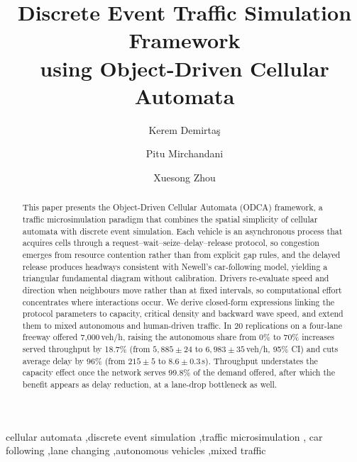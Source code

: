 \documentclass[review,authoryear]{elsarticle}
\begin{document}
\begin{frontmatter}

\title{Discrete Event Traffic Simulation Framework\\using Object-Driven Cellular Automata}

\author[asu]{Kerem Demirta\c{s}}
\author[asu]{Pitu Mirchandani}
\author[ssebe]{Xuesong Zhou}


\begin{abstract}
This paper presents the Object-Driven Cellular Automata (ODCA) framework, a traffic microsimulation paradigm that combines the spatial simplicity of cellular automata with discrete event simulation. Each vehicle is an asynchronous process that acquires cells through a request--wait--seize--delay--release protocol, so congestion emerges from resource contention rather than from explicit gap rules, and the delayed release produces headways consistent with Newell's car-following model, yielding a triangular fundamental diagram without calibration. Drivers re-evaluate speed and direction when neighbours move rather than at fixed intervals, so computational effort concentrates where interactions occur. We derive closed-form expressions linking the protocol parameters to capacity, critical density and backward wave speed, and extend them to mixed autonomous and human-driven traffic. In 20 replications on a four-lane freeway offered 7{,}000\,veh/h, raising the autonomous share from 0\% to 70\% increases served throughput by 18.7\% (from $5{,}885 \pm 24$ to $6{,}983 \pm 35$\,veh/h, 95\% CI) and cuts average delay by 96\% (from $215 \pm 5$ to $8.6 \pm 0.3$\,s). Throughput understates the capacity effect once the network serves 99.8\% of the demand offered, after which the benefit appears as delay reduction, at a lane-drop bottleneck as well.
\end{abstract}

\begin{keyword}
cellular automata \sep discrete event simulation \sep traffic microsimulation \sep
car following \sep lane changing \sep autonomous vehicles \sep mixed traffic
\end{keyword}

\end{frontmatter}
\end{document}

